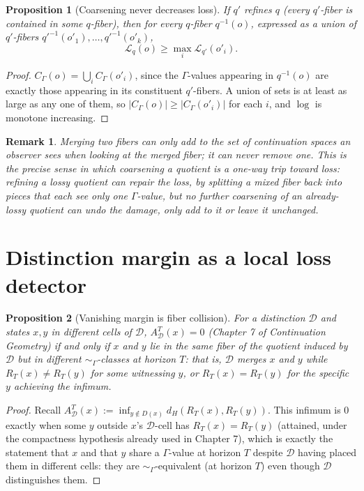 \documentclass[11pt]{report}
\newtheorem{proposition}{Proposition}[chapter]
\newtheorem{remark}{Remark}[chapter]
\begin{document}
\begin{proposition}[Coarsening never decreases loss]
\label{prop:monotone}
If $q'$ refines $q$ (every $q'$-fiber is contained in some $q$-fiber),
then for every $q$-fiber $q^{-1}(o)$, expressed as a union of
$q'$-fibers $q'^{-1}(o'_1), \dots, q'^{-1}(o'_k)$,
\[
\mathcal{L}_q(o) \geq \max_i \mathcal{L}_{q'}(o'_i).
\]
\end{proposition}
\begin{proof}
$C_\Gamma(o) = \bigcup_i C_{\Gamma}(o'_i)$, since the $\Gamma$-values
appearing in $q^{-1}(o)$ are exactly those appearing in its
constituent $q'$-fibers. A union of sets is at least as large as any
one of them, so $|C_\Gamma(o)| \geq |C_\Gamma(o'_i)|$ for each $i$,
and $\log$ is monotone increasing.
\end{proof}

\begin{remark}
Merging two fibers can only add to the set of continuation spaces an
observer sees when looking at the merged fiber; it can never remove
one. This is the precise sense in which coarsening a quotient is a
one-way trip toward loss: refining a lossy quotient can repair the
loss, by splitting a mixed fiber back into pieces that each see only
one $\Gamma$-value, but no further coarsening of an already-lossy
quotient can undo the damage, only add to it or leave it unchanged.
\end{remark}

\section*{Distinction margin as a local loss detector}

\begin{proposition}[Vanishing margin is fiber collision]
For a distinction $\mathcal{D}$ and states $x, y$ in different cells
of $\mathcal{D}$, $A_{\mathcal D}^T(x) = 0$ (Chapter 7 of
\emph{Continuation Geometry}) if and only if $x$ and $y$ lie in the
same fiber of the quotient induced by $\mathcal D$ but in different
$\sim_\Gamma$-classes at horizon $T$: that is, $\mathcal D$ merges $x$
and $y$ while $R_T(x) \neq R_T(y)$ for some witnessing $y$, or
$R_T(x) = R_T(y)$ for the specific $y$ achieving the infimum.
\end{proposition}
\begin{proof}
Recall $A_{\mathcal D}^T(x) := \inf_{y \notin D(x)} d_H(R_T(x), R_T(y))$.
This infimum is $0$ exactly when some $y$ outside $x$'s
$\mathcal{D}$-cell has $R_T(x) = R_T(y)$ (attained, under the
compactness hypothesis already used in Chapter 7), which is exactly
the statement that $x$ and that $y$ share a $\Gamma$-value at horizon
$T$ despite $\mathcal D$ having placed them in different cells: they
are $\sim_\Gamma$-equivalent (at horizon $T$) even though $\mathcal D$
distinguishes them.
\end{proof}
\end{document}
